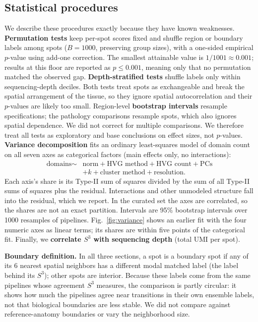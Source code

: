 \subsection{Statistical procedures}
\label{sec:stats}
We describe these procedures exactly because they have known weaknesses.
\textbf{Permutation tests} keep per-spot scores fixed and shuffle region or
boundary labels among spots ($B{=}1000$, preserving group sizes), with a
one-sided empirical $p$-value using add-one correction. The smallest
attainable value is $1/1001\approx0.001$; results at this floor are
reported as $p\le0.001$, meaning only that no permutation matched the
observed gap.
\textbf{Depth-stratified tests} shuffle labels only within
sequencing-depth deciles. Both tests treat spots as exchangeable and break
the spatial arrangement of the tissue, so they ignore spatial
autocorrelation and their $p$-values are likely too small. Region-level
\textbf{bootstrap intervals} resample specifications; the pathology
comparisons resample spots, which also ignores spatial dependence. We did
not correct for multiple comparisons. We therefore treat all tests as
exploratory and base conclusions on effect sizes, not $p$-values.
\textbf{Variance decomposition} fits an ordinary least-squares model of
domain count on all seven axes as categorical factors (main effects only,
no interactions):
\begin{align*}
  \text{domains} \sim{}& \text{norm} + \text{HVG method} + \text{HVG count}
  + \text{PCs}\\
  &+ k + \text{cluster method} + \text{resolution}.
\end{align*}
Each axis's share is its Type-II sum of squares divided by the sum of all
Type-II sums of squares plus the residual. Interactions and other unmodeled
structure fall into the residual, which we report. In the curated set the
axes are correlated, so the shares are not an exact partition. Intervals
are 95\% bootstrap intervals over 1000 resamples of pipelines.
Fig.~\ref{fig:variance} shows an earlier fit with the four numeric axes as
linear terms; its shares are within five points of the categorical fit.
Finally,
we \textbf{correlate $S^3$ with sequencing depth} (total UMI per spot).

\textbf{Boundary definition.} In all three sections, a spot is a boundary
spot if any of its 6 nearest spatial neighbors has a different modal
matched label (the label behind its $S^3$); other spots are interior.
Because these labels come from the same pipelines whose agreement $S^3$
measures, the comparison is partly circular: it shows how much the
pipelines agree near transitions in their own ensemble labels, not that
biological boundaries are less stable. We did not compare against
reference-anatomy boundaries or vary the neighborhood size.

